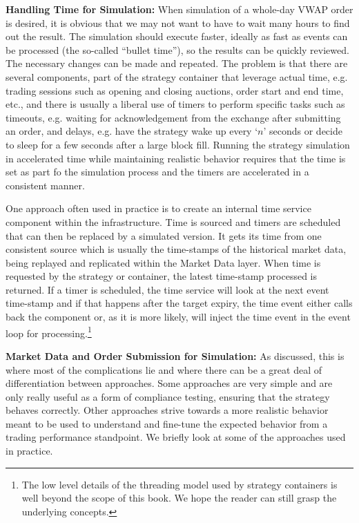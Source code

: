 \noindent\textbf{Handling Time for Simulation:} When simulation of a whole-day VWAP order is desired, it is obvious that we may not want to have to wait many hours to find out the result. The simulation should execute faster, ideally as fast as events can be processed (the so-called ``bullet time''), so the results can be quickly reviewed. The necessary changes can be made and repeated. The problem is that there are several components, part of the strategy container that leverage actual time, e.g. trading sessions such as opening and closing auctions, order start and end time, etc., and there is usually a liberal use of timers to perform specific tasks such as timeouts, e.g. waiting for acknowledgement from the exchange after submitting an order, and delays, e.g. have the strategy wake up every `$n$' seconds or decide to sleep for a few seconds after a large block fill. Running the strategy simulation in accelerated time while maintaining realistic behavior requires that the time is set as part fo the simulation process and the timers are accelerated in a consistent manner.


One approach often used in practice is to create an internal time service component within the infrastructure. Time is sourced and timers are scheduled that can then be replaced by a simulated version. It gets its time from one consistent source which is usually the time-stamps of the historical market data, being replayed and replicated within the Market Data layer. When time is requested by the strategy or container, the latest time-stamp processed is returned. If a timer is scheduled, the time service will look at the next event time-stamp and if that happens after the target expiry, the time event either calls back the component or, as it is more likely, will inject the time event in the event loop for processing.\footnote{The low level details of the threading model used by strategy containers is well beyond the scope of this book. We hope the reader can still grasp the underlying concepts.} \twomedskip


\noindent\textbf{Market Data and Order Submission for Simulation:} As discussed, this is where most of the complications lie and where there can be a great deal of differentiation between approaches. Some approaches are very simple and are only really useful as a form of compliance testing, ensuring that the strategy behaves correctly. Other approaches strive towards a more realistic behavior meant to be used to understand and fine-tune the expected behavior from a trading performance standpoint. We briefly look at some of the approaches used in practice. \twomedskip


